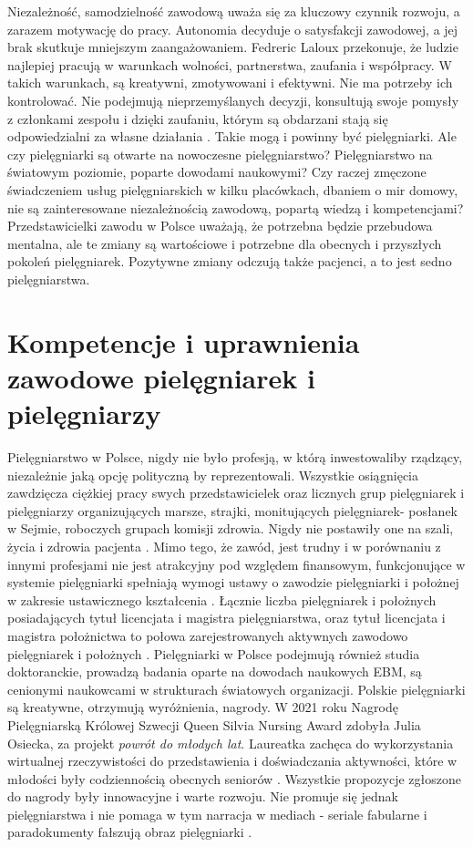 \documentclass[a4paper,12pt,twoside,openright]{mwrep}
\begin{document}
Niezależność, samodzielność zawodową uważa się za kluczowy czynnik rozwoju, a zarazem motywację do pracy. Autonomia decyduje o satysfakcji zawodowej, a jej brak skutkuje mniejszym zaangażowaniem. Fedreric Laloux przekonuje, że ludzie najlepiej pracują w warunkach wolności, partnerstwa, zaufania i współpracy. W takich warunkach, są kreatywni, zmotywowani i efektywni. Nie ma potrzeby ich kontrolować. Nie podejmują nieprzemyślanych decyzji, konsultują swoje pomysły z członkami zespołu i dzięki zaufaniu, którym są obdarzani stają się odpowiedzialni za własne działania \cite{federic}. Takie mogą i powinny być pielęgniarki. Ale czy pielęgniarki są otwarte na nowoczesne pielęgniarstwo? Pielęgniarstwo na światowym poziomie, poparte dowodami naukowymi? Czy raczej zmęczone świadczeniem usług pielęgniarskich w kilku placówkach, dbaniem o mir domowy, nie są zainteresowane niezależnością zawodową, popartą wiedzą i kompetencjami? Przedstawicielki zawodu w Polsce uważają, że potrzebna będzie przebudowa mentalna, ale te zmiany są wartościowe i potrzebne dla obecnych i przyszłych pokoleń pielęgniarek. Pozytywne zmiany odczują także pacjenci, a to jest sedno pielęgniarstwa.

\section{Kompetencje i uprawnienia zawodowe \newline pielęgniarek i pielęgniarzy}
Pielęgniarstwo w Polsce, nigdy nie było profesją, w którą inwestowaliby rządzący, niezależnie jaką opcję polityczną by reprezentowali. Wszystkie osiągnięcia zawdzięcza ciężkiej pracy swych przedstawicielek oraz licznych grup pielęgniarek i pielęgniarzy organizujących marsze, strajki, monitujących pielęgniarek- posłanek w Sejmie, roboczych grupach komisji zdrowia. Nigdy nie postawiły one na szali, życia i zdrowia pacjenta \cite{strajk}. Mimo tego, że zawód, jest trudny i w porównaniu z innymi profesjami nie jest atrakcyjny pod względem finansowym, funkcjonujące w systemie pielęgniarki spełniają wymogi ustawy o zawodzie pielęgniarki i położnej  w zakresie ustawicznego kształcenia \cite{2011}. Łącznie liczba pielęgniarek i położnych posiadających tytuł licencjata i magistra pielęgniarstwa, oraz tytuł licencjata i magistra położnictwa to połowa zarejestrowanych aktywnych zawodowo pielęgniarek i położnych \cite{ile}. Pielęgniarki w Polsce podejmują również studia doktoranckie, prowadzą badania oparte na dowodach naukowych EBM, są cenionymi naukowcami w strukturach światowych organizacji. Polskie pielęgniarki są kreatywne, otrzymują wyróżnienia, nagrody. W 2021 roku Nagrodę Pielęgniarską Królowej Szwecji Queen Silvia Nursing Award zdobyła Julia Osiecka, za projekt \textit{powrót do młodych lat}. Laureatka zachęca do wykorzystania wirtualnej rzeczywistości do przedstawienia i doświadczania aktywności, które w młodości były codziennością obecnych seniorów \cite{julia}. Wszystkie propozycje zgłoszone do nagrody były innowacyjne i warte rozwoju. Nie promuje się jednak  pielęgniarstwa i nie pomaga w tym narracja w mediach - seriale fabularne i paradokumenty fałszują obraz pielęgniarki \cite{postrzeganie}.
\end{document}

